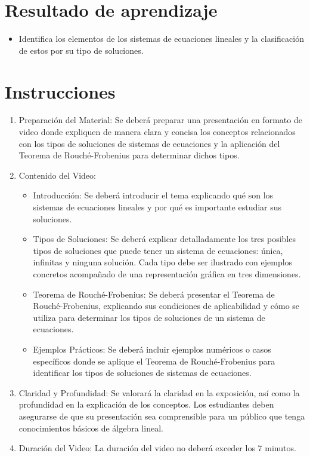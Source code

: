 \documentclass[a4,11pt]{aleph-notas}
\begin{document}
\encabezado

\vspace*{-10mm}
\section{Resultado de aprendizaje}

\begin{itemize}
\item 
    Identifica los elementos de los sistemas de ecuaciones lineales y la clasificación de estos por su tipo de soluciones.
\end{itemize}


\section{Instrucciones}

\begin{enumerate}
    \item Preparación del Material: Se deberá preparar una presentación en formato de video donde expliquen de manera clara y concisa los conceptos relacionados con los tipos de soluciones de sistemas de ecuaciones y la aplicación del Teorema de Rouché-Frobenius para determinar dichos tipos.
    \item Contenido del Video:
    \begin{itemize}
        \item Introducción: Se deberá introducir el tema explicando qué son los sistemas de ecuaciones lineales y por qué es importante estudiar sus soluciones.
        \item Tipos de Soluciones: Se deberá explicar detalladamente los tres posibles tipos de soluciones que puede tener un sistema de ecuaciones: única, infinitas y ninguna solución. Cada tipo debe ser ilustrado con ejemplos concretos acompañado de una representación gráfica en tres dimensiones.
        \item Teorema de Rouché-Frobenius: Se deberá presentar el Teorema de Rouché-Frobenius, explicando sus condiciones de aplicabilidad y cómo se utiliza para determinar los tipos de soluciones de un sistema de ecuaciones.
        \item Ejemplos Prácticos: Se deberá incluir ejemplos numéricos o casos específicos donde se aplique el Teorema de Rouché-Frobenius para identificar los tipos de soluciones de sistemas de ecuaciones.
    \end{itemize}
    \item Claridad y Profundidad: Se valorará la claridad en la exposición, así como la profundidad en la explicación de los conceptos. Los estudiantes deben asegurarse de que su presentación sea comprensible para un público que tenga conocimientos básicos de álgebra lineal.
    \item Duración del Video: La duración del video no deberá exceder los 7 minutos.
\end{enumerate}
\end{document}
